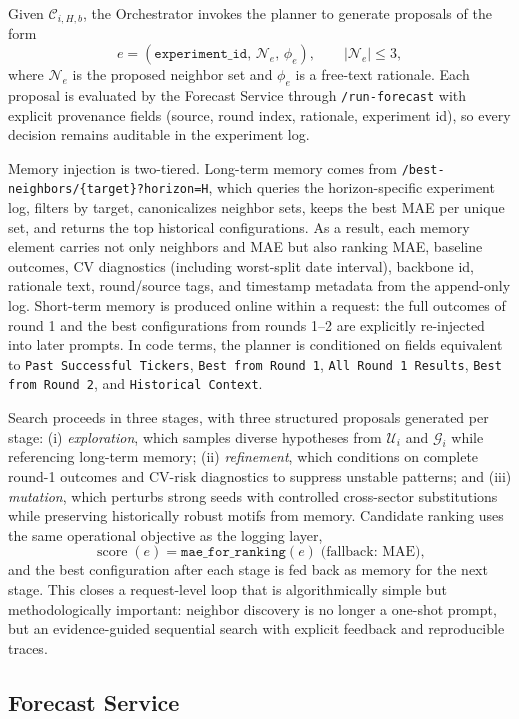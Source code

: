 \documentclass[12pt,a4paper,titlepage]{article}
\begin{document}
Given \(\mathcal{C}_{i,H,b}\), the Orchestrator invokes the planner to generate proposals of the form
\[
e=(\texttt{experiment\_id},\,\mathcal{N}_e,\,\phi_e),\qquad |\mathcal{N}_e|\le 3,
\]
where \(\mathcal{N}_e\) is the proposed neighbor set and \(\phi_e\) is a free-text rationale. Each proposal is evaluated by the Forecast Service through \texttt{/run-forecast} with explicit provenance fields (source, round index, rationale, experiment id), so every decision remains auditable in the experiment log.

Memory injection is two-tiered. Long-term memory comes from \texttt{/best-neighbors/\{target\}?horizon=H}, which queries the horizon-specific experiment log, filters by target, canonicalizes neighbor sets, keeps the best MAE per unique set, and returns the top historical configurations. As a result, each memory element carries not only neighbors and MAE but also ranking MAE, baseline outcomes, CV diagnostics (including worst-split date interval), backbone id, rationale text, round/source tags, and timestamp metadata from the append-only log. Short-term memory is produced online within a request: the full outcomes of round 1 and the best configurations from rounds 1--2 are explicitly re-injected into later prompts. In code terms, the planner is conditioned on fields equivalent to \texttt{Past Successful Tickers}, \texttt{Best from Round 1}, \texttt{All Round 1 Results}, \texttt{Best from Round 2}, and \texttt{Historical Context}.

Search proceeds in three stages, with three structured proposals generated per stage: (i) \emph{exploration}, which samples diverse hypotheses from \(\mathcal{U}_i\) and \(\mathcal{G}_i\) while referencing long-term memory; (ii) \emph{refinement}, which conditions on complete round-1 outcomes and CV-risk diagnostics to suppress unstable patterns; and (iii) \emph{mutation}, which perturbs strong seeds with controlled cross-sector substitutions while preserving historically robust motifs from memory. Candidate ranking uses the same operational objective as the logging layer,
\[
\operatorname{score}(e)=\texttt{mae\_for\_ranking}(e)\;\text{(fallback: MAE)},
\]
and the best configuration after each stage is fed back as memory for the next stage. This closes a request-level loop that is algorithmically simple but methodologically important: neighbor discovery is no longer a one-shot prompt, but an evidence-guided sequential search with explicit feedback and reproducible traces.

\subsection{Forecast Service}
\end{document}
